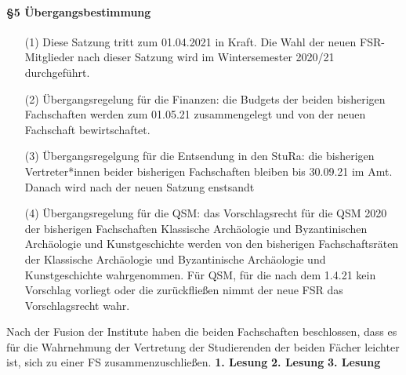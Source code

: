 {    \paragraph{§5 Übergangsbestimmung}
    \begin{enumerate}
        \item[(1)] Diese  Satzung  tritt  zum  01.04.2021  in  Kraft.  Die  Wahl  der  neuen  FSR-Mitglieder  nach dieser Satzung wird im Wintersemester 2020/21 durchgeführt.
        \item[(2)] Übergangsregelung  für  die  Finanzen:  die  Budgets  der  beiden  bisherigen  Fachschaften werden zum 01.05.21 zusammengelegt und von der neuen Fachschaft bewirtschaftet.
        \item[(3)] Übergangsregelgung für die Entsendung in den StuRa: die bisherigen Vertreter*innen beider bisherigen Fachschaften bleiben bis 30.09.21 im Amt. Danach wird nach der neuen Satzung enstsandt
        \item[(4)] Übergangsregelung  für  die  QSM:  das  Vorschlagsrecht  für  die  QSM  2020  der  bisherigen Fachschaften Klassische Archäologie und Byzantinischen Archäologie und Kunstgeschichte werden von den bisherigen Fachschaftsräten der Klassische Archäologie und Byzantinische Archäologie und Kunstgeschichte wahrgenommen. Für QSM, für die nach dem 1.4.21 kein Vorschlag vorliegt oder die zurückfließen nimmt der neue FSR das Vorschlagsrecht wahr.  
    \end{enumerate}
}{
    Nach der Fusion der Institute haben die beiden Fachschaften beschlossen, dass es für die Wahrnehmung der Vertretung der Studierenden der beiden Fächer leichter ist, sich zu einer FS zusammenzuschließen.
}{
    \textbf{1. Lesung}
    \ul{
    }
    \textbf{2. Lesung}
    \ul{
    }
    \textbf{3. Lesung}
    \ul{
    }
}{

}

